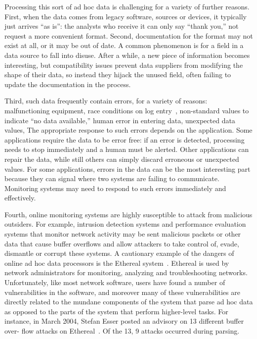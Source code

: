 \documentclass[10pt]{article}
\begin{document}
Processing this sort of 
ad hoc data is challenging for a variety of further reasons. 
First, when the data comes from legacy software, sources or devices, it 
typically just arrives ``as is'': the analysts
who receive it can only say ``thank you,'' not request a more
convenient format.  Second, documentation for the format may not exist
at all, or it may be out of date.  A common phenomenon is for a field
in a data source to fall into disuse.  After a while, a new piece of
information becomes interesting, but compatibility issues prevent data
suppliers from modifying the shape of their data, so instead they
hijack the unused field, often failing to update the documentation in
the process.

Third, such data frequently contain errors, for a variety of reasons:
malfunctioning equipment, race conditions on log entry~\cite{wpp},
non-standard values to indicate ``no data available,'' human error in
entering data, unexpected data values, \etc{} The appropriate response
to such errors depends on the application.  Some applications require
the data to be error free: if an error is detected, processing needs
to stop immediately and a human must be alerted.  Other applications
can repair the data, while still others can simply discard erroneous
or unexpected values.  For some applications, errors in the data can
be the most interesting part because they can signal where two systems
are failing to communicate.  Monitoring systems may need to respond to such
errors immediately and effectively.

Fourth, online monitoring systems
are highly susceptible to attack from malicious outsiders.
For example, intrusion detection systems
and performance evaluation systems that monitor network activity 
may be sent malicious packets or other data that cause buffer overflows
and allow attackers to take control of, evade, dismantle or corrupt these
systems.  A cautionary example of the dangers of online ad hoc data
processors is the Ethereal system~\cite{ethereal}. Ethereal is used by network administrators for monitoring, analyzing
and troubleshooting networks. Unfortunately, like most network software, users have found a number of
vulnerabilities in the software, and moreover many of these vulnerabilities are directly related to the mundane
components of the system that parse ad hoc data as opposed to the parts of the system that perform
higher-level tasks. For instance, in March 2004, Stefan Esser posted an advisory on 13 different buffer over-
flow attacks on Ethereal~\cite{etherealvulnerabilities}. Of the 13, 9 attacks occurred during parsing.
\end{document}

